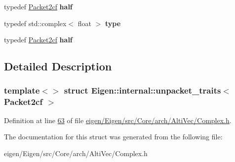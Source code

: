\begin{DoxyCompactItemize}
typedef \hyperlink{struct_eigen_1_1internal_1_1_packet2cf}{Packet2cf} {\bfseries half}
\item 
\mbox{\label{struct_eigen_1_1internal_1_1unpacket__traits_3_01_packet2cf_01_4_a55870d9184e1deef0663f4d6741bc3c2}} 
typedef std\+::complex$<$ float $>$ {\bfseries type}
\item 
\mbox{\label{struct_eigen_1_1internal_1_1unpacket__traits_3_01_packet2cf_01_4_a706e6fd2e56f984265c7d4696448973d}} 
typedef \hyperlink{struct_eigen_1_1internal_1_1_packet2cf}{Packet2cf} {\bfseries half}
\end{DoxyCompactItemize}


\subsection{Detailed Description}
\subsubsection*{template$<$$>$\newline
struct Eigen\+::internal\+::unpacket\+\_\+traits$<$ Packet2cf $>$}



Definition at line \hyperlink{eigen_2_eigen_2src_2_core_2arch_2_alti_vec_2_complex_8h_source_l00063}{63} of file \hyperlink{eigen_2_eigen_2src_2_core_2arch_2_alti_vec_2_complex_8h_source}{eigen/\+Eigen/src/\+Core/arch/\+Alti\+Vec/\+Complex.\+h}.



The documentation for this struct was generated from the following file\+:\begin{DoxyCompactItemize}
\item 
eigen/\+Eigen/src/\+Core/arch/\+Alti\+Vec/\+Complex.\+h\end{DoxyCompactItemize}
